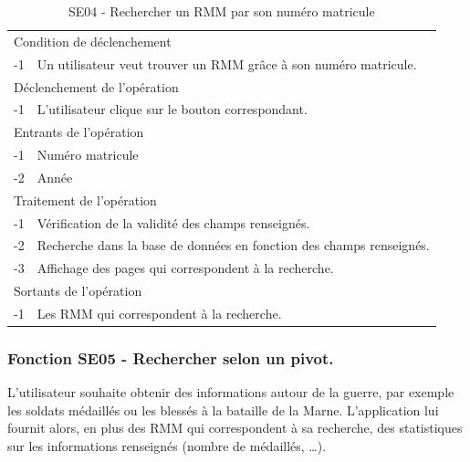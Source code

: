 \documentclass[a4paper]{article}
\begin{document}
\begin{table}[H]
  \centering
   \small
	\begin{tabular}{|c|p{12cm}|}
   		\hline
   			\rowcolor{lightgray}\multicolumn{2}{|c|}{\textbf{SE04 - Rechercher un RMM par son numéro matricule}} \\
   		\hline
   			\multicolumn{2}{|l|}{Condition de d\'eclenchement} \\
   		\hline
   			-1 & Un utilisateur veut trouver un RMM grâce à son numéro matricule. \\
   		\hline
   			\multicolumn{2}{|l|}{D\'eclenchement de l'op\'eration} \\
   		\hline
   			-1 & L'utilisateur clique sur le bouton correspondant. \\
   		\hline
   			\multicolumn{2}{|l|}{Entrants de l'op\'eration} \\
   		\hline
   			-1 & Numéro matricule \\
            -2 & Année \\
   		\hline
   			\multicolumn{2}{|l|}{Traitement de l'op\'eration} \\
  		\hline
  			-1 & Vérification de la validité des champs renseignés. \\
   			-2 & Recherche dans la base de données en fonction des champs renseignés. \\
        	-3 & Affichage des pages qui correspondent à la recherche. \\
   		\hline
   			\multicolumn{2}{|l|}{Sortants de l'op\'eration} \\
   		\hline
   			-1 & Les RMM qui correspondent à la recherche. \\
   		\hline
	\end{tabular}
  \caption{SE04 - Rechercher un RMM par son numéro matricule}
  \normalsize
  \label{tab:SE04}
\end{table}

\subsubsection{Fonction SE05 - Rechercher selon un pivot.}

L'utilisateur souhaite obtenir des informations autour de la guerre, par exemple les soldats médaillés ou les blessés à la bataille de la Marne. L'application lui fournit alors, en plus des RMM qui correspondent à sa recherche, des statistiques sur les informations renseignés (nombre de médaillés, \ldots).
\\
\end{document}
